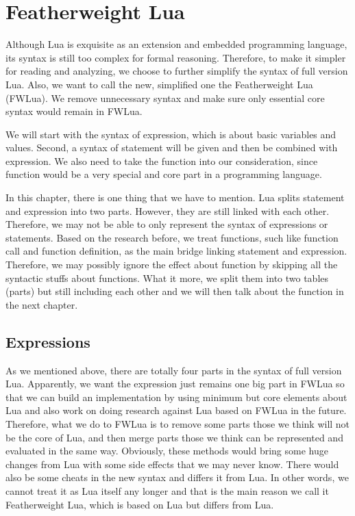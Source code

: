 \chapter{Featherweight Lua}
Although Lua is exquisite as an extension and embedded programming language, its syntax is still too complex for formal reasoning. Therefore, to make it simpler for reading and analyzing, we choose to further simplify the syntax of full version Lua. Also, we want to call the new, simplified one the Featherweight Lua (FWLua). We remove unnecessary syntax and make sure only essential core syntax would remain in FWLua.

We will start with the syntax of expression, which is about basic variables and values. Second, a syntax of statement will be given and then be combined with expression. We also need to take the function into our consideration, since function would be a very special and core part in a programming language.

In this chapter, there is one thing that we have to mention. Lua splits statement and expression into two parts. However, they are still linked with each other. Therefore, we may not be able to only represent the syntax of expressions or statements. Based on the research before, we treat functions, such like function call and function definition, as the main bridge linking statement and expression. Therefore, we may possibly ignore the effect about function by skipping all the syntactic stuffs about functions. What it more, we split them into two tables (parts) but still including each other and we will then talk about the function in the next chapter.

\section{Expressions}
As we mentioned above, there are totally four parts in the syntax of full version Lua. Apparently, we want the expression just remains one big part in FWLua so that we can build an implementation by using minimum but core elements about Lua and also work on doing research against Lua based on FWLua in the future. Therefore, what we do to FWLua is to remove some parts those we think will not be the core of Lua, and then merge parts those we think can be represented and evaluated in the same way. Obviously, these methods would bring some huge changes from Lua with some side effects that we may never know. There would also be some cheats in the new syntax and differs it from Lua. In other words, we cannot treat it as Lua itself any longer and that is the main reason we call it Featherweight Lua, which is based on Lua but differs from Lua.

